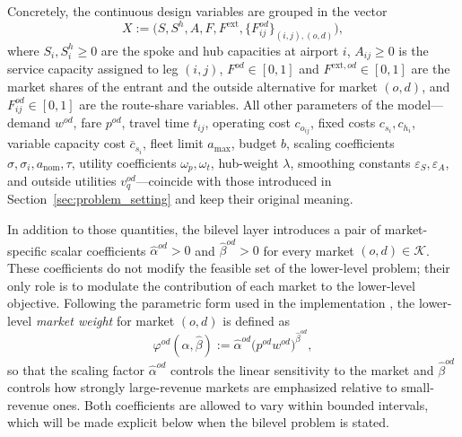 Concretely, the continuous design variables are grouped in the vector
\begin{equation}
X:=\bigl(S,S^h,A,F,F^{\mathrm{ext}},\{F_{ij}^{od}\}_{(i,j),(o,d)}\bigr),
\label{eq:single_level_X}
\end{equation}
where $S_i,S_i^h\ge 0$ are the spoke and hub capacities at airport $i$, $A_{ij}\ge 0$ is the service capacity assigned to leg $(i,j)$, $F^{od}\in[0,1]$ and $F^{\mathrm{ext},od}\in[0,1]$ are the market shares of the entrant and the outside alternative for market $(o,d)$, and $F_{ij}^{od}\in[0,1]$ are the route-share variables. All other parameters of the model—demand $w^{od}$, fare $p^{od}$, travel time $t_{ij}$, operating cost $c_{o_{ij}}$, fixed costs $c_{s_i},c_{h_i}$, variable capacity cost $\bar c_{s_i}$, fleet limit $a_{\max}$, budget $b$, scaling coefficients $\sigma,\sigma_i,a_{\mathrm{nom}},\tau$, utility coefficients $\omega_p,\omega_t$, hub-weight $\lambda$, smoothing constants $\varepsilon_S,\varepsilon_A$, and outside utilities $v_q^{od}$—coincide with those introduced in Section~\ref{sec:problem_setting} and keep their original meaning.

In addition to those quantities, the bilevel layer introduces a pair of market-specific scalar coefficients $\widehat{\alpha}^{od}>0$ and $\widehat{\beta}^{od}>0$ for every market $(o,d)\in\mathcal{K}$. These coefficients do not modify the feasible set of the lower-level problem; their only role is to modulate the contribution of each market to the lower-level objective. Following the parametric form used in the implementation \cite{RealRojas2025AIAA}, the lower-level \emph{market weight} for market $(o,d)$ is defined as
\begin{equation}
\varphi^{od}(\widehat{\alpha},\widehat{\beta})
:=\widehat{\alpha}^{od}\bigl(p^{od}w^{od}\bigr)^{\widehat{\beta}^{od}},
\label{eq:phi_market_weight}
\end{equation}
so that the scaling factor $\widehat{\alpha}^{od}$ controls the linear sensitivity to the market and $\widehat{\beta}^{od}$ controls how strongly large-revenue markets are emphasized relative to small-revenue ones. Both coefficients are allowed to vary within bounded intervals, which will be made explicit below when the bilevel problem is stated.

